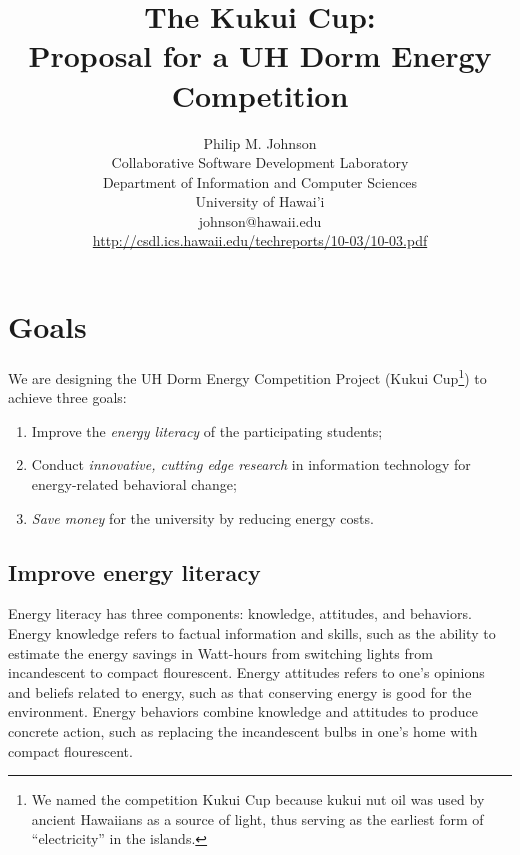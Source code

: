 \documentclass[11pt]{article}
\begin{document}
\title{The Kukui Cup: \\Proposal for a UH Dorm Energy Competition}

\author{Philip M. Johnson \\
Collaborative Software Development Laboratory \\
Department of Information and Computer Sciences \\
University of Hawai'i \\
johnson@hawaii.edu \\
\url{http://csdl.ics.hawaii.edu/techreports/10-03/10-03.pdf}
}

\maketitle

\tableofcontents
\newpage

\section{Goals}

We are designing the UH Dorm Energy Competition Project (Kukui
Cup\footnote{We named the competition Kukui Cup because kukui nut oil was used by ancient Hawaiians as a source of light,
  thus serving as the earliest form of ``electricity'' in the islands.}) to achieve three goals:
\begin{enumerate}
\item Improve the {\em energy literacy} of the participating students;
\item Conduct {\em innovative, cutting edge research} in information technology for
  energy-related behavioral change;
\item {\em Save money} for the university by reducing energy costs.
\end{enumerate}

\subsection{Improve energy literacy}

Energy literacy \cite{DeWaters09b, DeWaters09} has three components:
knowledge, attitudes, and behaviors. Energy knowledge refers to factual 
information and skills, such as the ability to estimate the energy savings
in Watt-hours from switching lights from incandescent to compact
flourescent.   Energy attitudes refers to one's opinions and beliefs
related to energy, such as that conserving energy is good for
the environment.   Energy behaviors combine knowledge and attitudes to
produce concrete action, such as replacing the incandescent bulbs in one's
home with compact flourescent. 
\end{document}
